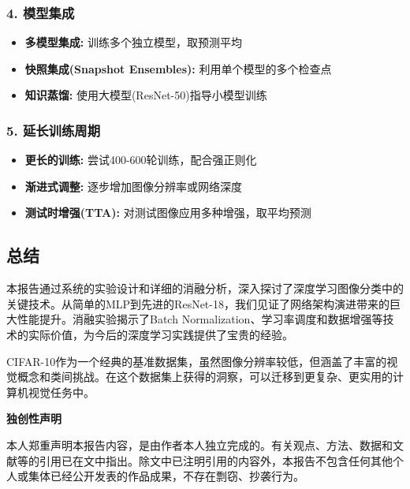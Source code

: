 \documentclass[12pt,a4paper]{article}
\begin{document}
\subsubsection{4. 模型集成}

\begin{itemize}[leftmargin=2em]
    \item \textbf{多模型集成:} 训练多个独立模型，取预测平均
    \item \textbf{快照集成(Snapshot Ensembles):} 利用单个模型的多个检查点
    \item \textbf{知识蒸馏:} 使用大模型(ResNet-50)指导小模型训练
\end{itemize}

\subsubsection{5. 延长训练周期}

\begin{itemize}[leftmargin=2em]
    \item \textbf{更长的训练:} 尝试400-600轮训练，配合强正则化
    \item \textbf{渐进式调整:} 逐步增加图像分辨率或网络深度
    \item \textbf{测试时增强(TTA):} 对测试图像应用多种增强，取平均预测
\end{itemize}

\subsection{总结}

本报告通过系统的实验设计和详细的消融分析，深入探讨了深度学习图像分类中的关键技术。从简单的MLP到先进的ResNet-18，我们见证了网络架构演进带来的巨大性能提升。消融实验揭示了Batch Normalization、学习率调度和数据增强等技术的实际价值，为今后的深度学习实践提供了宝贵的经验。

CIFAR-10作为一个经典的基准数据集，虽然图像分辨率较低，但涵盖了丰富的视觉概念和类间挑战。在这个数据集上获得的洞察，可以迁移到更复杂、更实用的计算机视觉任务中。

\newpage
\thispagestyle{empty}
\vspace*{2cm}
\begin{center}
    {\Large\bfseries 独创性声明}
\end{center}

\vspace{1.5cm}

\noindent 本人郑重声明本报告内容，是由作者本人独立完成的。有关观点、方法、数据和文献等的引用已在文中指出。除文中已注明引用的内容外，本报告不包含任何其他个人或集体已经公开发表的作品成果，不存在剽窃、抄袭行为。
\end{document}

